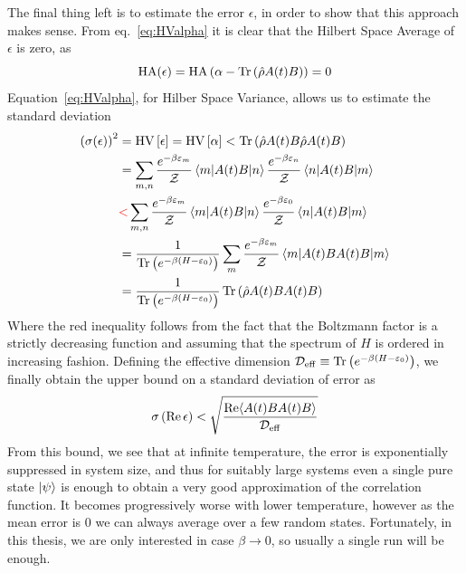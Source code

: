 The final thing left is to estimate the error \(\epsilon\), in order to show that this approach makes sense.
From eq.~\eqref{eq:HValpha} it is clear that the Hilbert Space Average of \(\epsilon\) is zero, as
\begin{equation}
	\mathrm{HA}(\epsilon) = \mathrm{HA}\left(\alpha - \Tr\left(\hat{\rho}A(t)B\right)\right) = 0
\end{equation}
Equation~\eqref{eq:HValpha}, for Hilber Space Variance, allows us to estimate the standard deviation 
\begin{align}
	\left(\sigma(\epsilon)\right)^2 &= \mathrm{HV}\left[\epsilon\right] = \mathrm{HV}\left[\alpha\right] < \Tr\left(\hat{\rho}A(t)B \hat{\rho}A(t)B\right) \nonumber\\
	&= \sum_{m,n} \frac{e^{-\beta \varepsilon_m}}{\mathcal{Z}} \matrixel{m}{A(t)B}{n} \frac{e^{-\beta \varepsilon_n}}{\mathcal{Z}} \matrixel{n}{A(t)B}{m}\nonumber \\
	&\textcolor{red}{<}  \sum_{m,n} \frac{e^{-\beta \varepsilon_m}}{\mathcal{Z}} \matrixel{m}{A(t)B}{n} \frac{e^{-\beta \varepsilon_0}}{\mathcal{Z}} \matrixel{n}{A(t)B}{m} \nonumber\\
	&= \frac{1}{\Tr\left(e^{-\beta(H-\varepsilon_0)}\right)} \sum_{m} \frac{e^{-\beta \varepsilon_m}}{\mathcal{Z}} \matrixel{m}{A(t)B A(t) B}{m} \nonumber\\
	&= \frac{1}{\Tr\left(e^{-\beta(H-\varepsilon_0)}\right)} \Tr\left(\hat{\rho} A(t)B A(t) B\right)
\end{align}
Where the red inequality follows from the fact that the Boltzmann factor is a strictly decreasing function and assuming that the spectrum
of \(H\) is ordered in increasing fashion. Defining the effective dimension \(\mathcal{D}_{\mathrm{eff}} \equiv \Tr\left(e^{-\beta(H-\varepsilon_0)}\right)\),
we finally obtain the upper bound on a standard deviation of error as 
\begin{equation}
	\sigma\left(\Re \epsilon\right) < \sqrt{\frac{\Re \langle A(t)B A(t) B \rangle}{\mathcal{D}_{\mathrm{eff}}}}
	\label{eq:dqt_bound}
\end{equation}
From this bound, we see that at infinite temperature, the error is exponentially suppressed in system size, and thus for suitably large systems even a single pure state \(\ket{\psi}\) is enough to obtain a very good approximation of the correlation function.
It becomes progressively worse with lower temperature, however as the mean error is \(0\) we can always average over a few random
states. Fortunately, in this thesis, we are only interested in case \(\beta \to 0\), so usually a single run will be enough.

